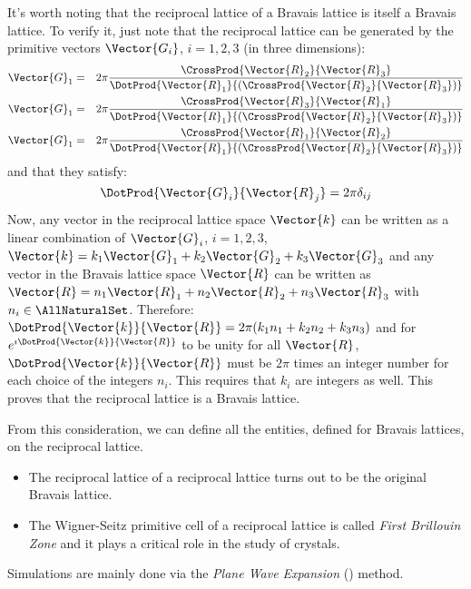 It's worth noting that the reciprocal lattice of a Bravais lattice is
itself a Bravais lattice. To verify it, just note that the reciprocal
lattice can be generated by the primitive vectors $\Vector{G_i}$, $i =
1,2,3$ (in three dimensions):
\begin{eqnarray*}
\Vector{G}_1 & = & 2 \pi
\frac{\CrossProd{\Vector{R}_2}{\Vector{R}_3}}{\DotProd{\Vector{R}_1}{(\CrossProd{\Vector{R}_2}{\Vector{R}_3})}} \\
\Vector{G}_1 & = & 2 \pi
\frac{\CrossProd{\Vector{R}_3}{\Vector{R}_1}}{\DotProd{\Vector{R}_1}{(\CrossProd{\Vector{R}_2}{\Vector{R}_3})}} \\
\Vector{G}_1 & = & 2 \pi
\frac{\CrossProd{\Vector{R}_1}{\Vector{R}_2}}{\DotProd{\Vector{R}_1}{(\CrossProd{\Vector{R}_2}{\Vector{R}_3})}}
\end{eqnarray*}
and that they satisfy:
$$
\DotProd{\Vector{G}_i}{\Vector{R}_j} = 2 \pi \delta_{ij}
$$
Now, any vector in the reciprocal lattice space $\Vector{k}$ can be
written as a linear combination of $\Vector{G}_i$, $i = 1,2,3$,
$\Vector{k} = k_1 \Vector{G}_1 + k_2 \Vector{G}_2 + k_3 \Vector{G}_3$
and any vector in the Bravais lattice space $\Vector{R}$ can be
written as $\Vector{R} = n_1 \Vector{R}_1 + n_2 \Vector{R}_2 + n_3
\Vector{R}_3$ with $n_i \in \AllNaturalSet$. Therefore:
$\DotProd{\Vector{k}}{\Vector{R}} = 2 \pi (k_1 n_1 + k_2 n_2 + k_3
n_3)$ and for $e^{\imath \DotProd{\Vector{k}}{\Vector{R}}}$ to be
unity for all $\Vector{R}$, $\DotProd{\Vector{k}}{\Vector{R}}$ must be
$2 \pi$ times an integer number for each choice of the integers
$n_i$. This requires that $k_i$ are integers as well. This proves that
the reciprocal lattice is a Bravais lattice.

From this consideration, we can define all the entities, defined for
Bravais lattices, on the reciprocal lattice.
\begin{itemize}
\item
  The reciprocal lattice of a reciprocal lattice turns out to be the original
  Bravais lattice.
\item
  The Wigner-Seitz primitive cell of a reciprocal lattice is called
  \emph{First Brillouin Zone} and it plays a critical role in the
  study of crystals.
\end{itemize}



Simulations are mainly done via the \emph{Plane Wave Expansion}
() method.
